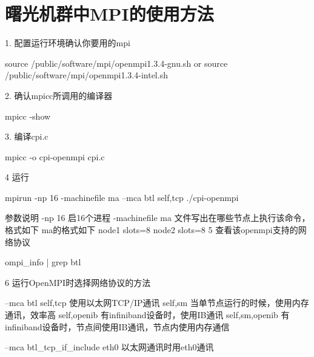 

\section{曙光机群中MPI的使用方法}

1. 配置运行环境确认你要用的mpi

	source /public/software/mpi/openmpi1.3.4-gnu.sh
or 
	source /public/software/mpi/openmpi1.3.4-intel.sh

2. 确认mpicc所调用的编译器

	mpicc -show

3. 编译cpi.c
	
	mpicc -o cpi-openmpi cpi.c

4 运行

	mpirun -np 16 -machinefile ma --mca btl self,tcp  ./cpi-openmpi

参数说明
	-np 16 启16个进程
	-machinefile ma 文件写出在哪些节点上执行该命令，格式如下
	ma的格式如下
	node1 slots=8
	node2 slots=8
5 查看该openmpi支持的网络协议

	ompi_info | grep btl 

6 运行OpenMPI时选择网络协议的方法

--mca btl self,tcp              使用以太网TCP/IP通讯
               self,sm               当单节点运行的时候，使用内存通讯，效率高
               self,openib         有infiniband设备时，使用IB通讯
               self,sm,openib   有infiniband设备时，节点间使用IB通讯，节点内使用内存通信

--mca btl_tcp_if_include eth0 以太网通讯时用eth0通讯

\newpage
